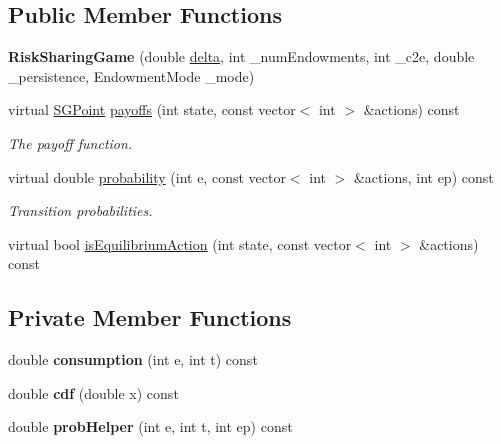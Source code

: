 \subsection*{Public Member Functions}
\begin{DoxyCompactItemize}
\item 
\mbox{\label{classRiskSharingGame_a45791290b135201e5ef5e5785c967748}} 
{\bfseries Risk\+Sharing\+Game} (double \hyperlink{classSGAbstractGame_a34c8905ac463bb2ec54aba4eb4ac376f}{delta}, int \+\_\+num\+Endowments, int \+\_\+c2e, double \+\_\+persistence, Endowment\+Mode \+\_\+mode)
\item 
virtual \hyperlink{classSGPoint}{S\+G\+Point} \hyperlink{classRiskSharingGame_a2aed9769b6518ed68b0c595629fb0129}{payoffs} (int state, const vector$<$ int $>$ \&actions) const
\begin{DoxyCompactList}\small\item\em The payoff function. \end{DoxyCompactList}\item 
virtual double \hyperlink{classRiskSharingGame_aa9ae41ec3aec3342ffd2d16187746718}{probability} (int e, const vector$<$ int $>$ \&actions, int ep) const
\begin{DoxyCompactList}\small\item\em Transition probabilities. \end{DoxyCompactList}\item 
virtual bool \hyperlink{classRiskSharingGame_a7da6b669317562cd9df8dfc0f8226b4c}{is\+Equilibrium\+Action} (int state, const vector$<$ int $>$ \&actions) const
\end{DoxyCompactItemize}
\subsection*{Private Member Functions}
\begin{DoxyCompactItemize}
\item 
\mbox{\label{classRiskSharingGame_afc7b13c5ac6db8692cc4fb7760cee8dd}} 
double {\bfseries consumption} (int e, int t) const
\item 
\mbox{\label{classRiskSharingGame_a8d6ce5f102ec1b4b87a8c4ea0e904c1c}} 
double {\bfseries cdf} (double x) const
\item 
\mbox{\label{classRiskSharingGame_aef9d8593ca6d1666a712b23d7cedede7}} 
double {\bfseries prob\+Helper} (int e, int t, int ep) const
\end{DoxyCompactItemize}

